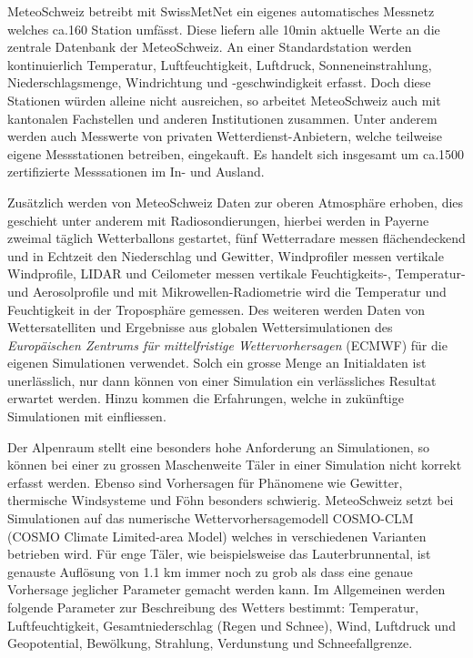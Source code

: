 \begin{refsection}
MeteoSchweiz betreibt mit SwissMetNet ein eigenes automatisches Messnetz welches ca.160 Station umfässt. Diese liefern alle 10min aktuelle Werte an die zentrale Datenbank der MeteoSchweiz. An einer Standardstation werden kontinuierlich Temperatur, Luftfeuchtigkeit, Luftdruck, Sonneneinstrahlung, Niederschlagsmenge, Windrichtung und -geschwindigkeit erfasst. Doch diese Stationen würden alleine nicht ausreichen, so arbeitet MeteoSchweiz auch mit kantonalen Fachstellen und anderen Institutionen zusammen. Unter anderem werden auch Messwerte von privaten Wetterdienst-Anbietern, welche teilweise eigene Messstationen betreiben, eingekauft. Es handelt sich insgesamt um ca.1500 zertifizierte Messsationen im In- und Ausland.

Zusätzlich werden von MeteoSchweiz Daten zur oberen Atmosphäre erhoben, dies geschieht unter anderem mit Radiosondierungen, hierbei werden in Payerne zweimal täglich Wetterballons gestartet, fünf Wetterradare messen flächendeckend und in Echtzeit den Niederschlag und Gewitter, Windprofiler messen vertikale Windprofile, LIDAR und Ceilometer messen vertikale Feuchtigkeits-, Temperatur- und Aerosolprofile und mit Mikrowellen-Radiometrie wird die  Temperatur und Feuchtigkeit in der Troposphäre gemessen. Des weiteren werden Daten von Wettersatelliten und Ergebnisse aus globalen Wettersimulationen des {\em Europäischen Zentrums für mittelfristige Wettervorhersagen} (ECMWF) für die eigenen Simulationen verwendet. Solch ein grosse Menge an Initialdaten ist unerlässlich, nur dann können von einer Simulation ein verlässliches Resultat erwartet werden. Hinzu kommen die Erfahrungen, welche in zukünftige Simulationen mit einfliessen. \cite{klima:meteoschweiz} 

Der Alpenraum stellt eine besonders hohe Anforderung an Simulationen, so können bei einer zu grossen Maschenweite Täler in einer Simulation nicht korrekt erfasst werden. Ebenso sind Vorhersagen  für Phänomene wie Gewitter, thermische Windsysteme und Föhn besonders schwierig. MeteoSchweiz setzt bei Simulationen auf das numerische Wettervorhersagemodell COSMO-CLM (COSMO Climate Limited-area Model) welches in verschiedenen Varianten betrieben wird. Für enge Täler, wie beispielsweise das Lauterbrunnental, ist genauste Auflösung von 1.1 km immer noch zu grob als dass eine genaue Vorhersage jeglicher Parameter gemacht werden kann.
Im Allgemeinen werden folgende Parameter zur Beschreibung des Wetters bestimmt: Temperatur, Luftfeuchtigkeit, Gesamtniederschlag (Regen und Schnee), Wind, Luftdruck und Geopotential, Bewölkung, Strahlung, Verdunstung und Schneefallgrenze.


\end{refsection}
